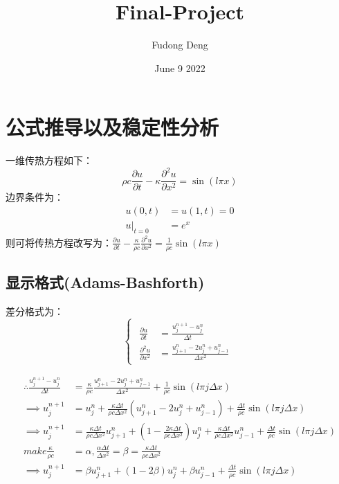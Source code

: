 \documentclass[
	20pt%
]{SUSTechHomework}
\title{Final-Project} %
\author{Fudong Deng} %
\date{June 9 2022} %
\begin{document}
\maketitle 
\large 
\section{公式推导以及稳定性分析}
\qquad 一维传热方程如下：
\begin{equation*}
    \rho c \frac{\partial u}{\partial t} - \kappa \frac{\partial^2 u}{\partial x^2} = \sin(l \pi x)
\end{equation*}
\qquad 边界条件为：
$$
\begin{aligned}
u(0,t) &= u(1,t) = 0\\
u|_{t=0} &= e^x
\end{aligned}
$$
\qquad 则可将传热方程改写为：$\frac{\partial u}{\partial t} - \frac{\kappa}{\rho c}\frac{\partial^2 u}{\partial x^2} = \frac{1}{\rho c}\sin(l \pi x)$
\subsection{显示格式(Adams-Bashforth)}
\qquad 差分格式为：
$$
\left\{ 
    \begin{array}{c}
        \begin{aligned}
        \frac{\partial u}{\partial t} &= \frac{u^{n+1}_j-u^n_j}{\Delta t}\\
        \frac{\partial^2 u}{\partial x^2} &= \frac{u^n_{j+1}-2u^n_j+u^n_{j-1}}{\Delta x^2}
        \end{aligned}
    \end{array}
\right.
$$

$$
\begin{aligned}
\therefore \frac{u^{n+1}_j-u^n_j}{\Delta t} &= \frac{\kappa}{\rho c} \frac{u^n_{j+1}-2u^n_j+u^n_{j-1}}{\Delta x^2} + \frac{1}{\rho c}\sin(l \pi j \Delta x) \\
\implies u^{n+1}_j &= u^n_j + \frac{\kappa \Delta t}{\rho c \Delta x^2} (u^n_{j+1}-2u^n_j+u^n_{j-1})+ \frac{\Delta t}{\rho c}\sin(l \pi j \Delta x)\\
\implies u^{n+1}_j &= \frac{\kappa \Delta t}{\rho c \Delta x^2} u^n_{j+1} + (1-\frac{2 \kappa \Delta t}{\rho c \Delta x^2}) u^n_j + \frac{\kappa \Delta t}{\rho c \Delta x^2}u^n_{j-1} + \frac{\Delta t}{\rho c}\sin(l \pi j \Delta x)\\
make  \frac{\kappa}{\rho c} &= \alpha, \frac{\alpha \Delta t}{\Delta x^2} = \beta = \frac{\kappa \Delta t}{\rho c \Delta x^2}\\
\implies u^{n+1}_j &= \beta u^n_{j+1} + (1-2\beta) u^n_j + \beta u^n_{j-1} + \frac{\Delta t}{\rho c}\sin(l \pi j \Delta x)\\
\end{aligned}
$$
\end{document}
